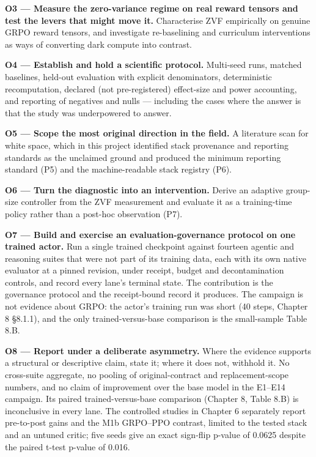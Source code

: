 \documentclass[12pt,a4paper]{report}
\begin{document}
\textbf{O3 --- Measure the zero-variance regime on real reward tensors
and test the levers that might move it.} Characterise ZVF empirically on
genuine GRPO reward tensors, and investigate re-baselining and
curriculum interventions as ways of converting dark compute into
contrast.

\textbf{O4 --- Establish and hold a scientific protocol.} Multi-seed
runs, matched baselines, held-out evaluation with explicit denominators,
deterministic recomputation, declared (not pre-registered) effect-size
and power accounting, and reporting of negatives and nulls --- including
the cases where the answer is that the study was underpowered to answer.

\textbf{O5 --- Scope the most original direction in the field.} A
literature scan for white space, which in this project identified stack
provenance and reporting standards as the unclaimed ground and produced
the minimum reporting standard (P5) and the machine-readable stack
registry (P6).

\textbf{O6 --- Turn the diagnostic into an intervention.} Derive an
adaptive group-size controller from the ZVF measurement and evaluate it
as a training-time policy rather than a post-hoc observation (P7).

\textbf{O7 --- Build and exercise an evaluation-governance protocol on
one trained actor.} Run a single trained checkpoint against fourteen
agentic and reasoning suites that were not part of its training data,
each with its own native evaluator at a pinned revision, under receipt,
budget and decontamination controls, and record every lane's terminal
state. The contribution is the governance protocol and the receipt-bound
record it produces. The campaign is not evidence about GRPO: the actor's
training run was short (40 steps, Chapter 8 §8.1.1), and the only
trained-versus-base comparison is the small-sample Table 8.B.

\textbf{O8 --- Report under a deliberate asymmetry.} Where the evidence
supports a structural or descriptive claim, state it; where it does not,
withhold it. No cross-suite aggregate, no pooling of original-contract
and replacement-scope numbers, and no claim of improvement over the base
model in the E1--E14 campaign. Its paired trained-versus-base comparison
(Chapter 8, Table 8.B) is inconclusive in every lane. The controlled
studies in Chapter 6 separately report pre-to-post gains and the M1b
GRPO--PPO contrast, limited to the tested stack and an untuned critic;
five seeds give an exact sign-flip p-value of 0.0625 despite the paired
t-test p-value of 0.016.
\end{document}
